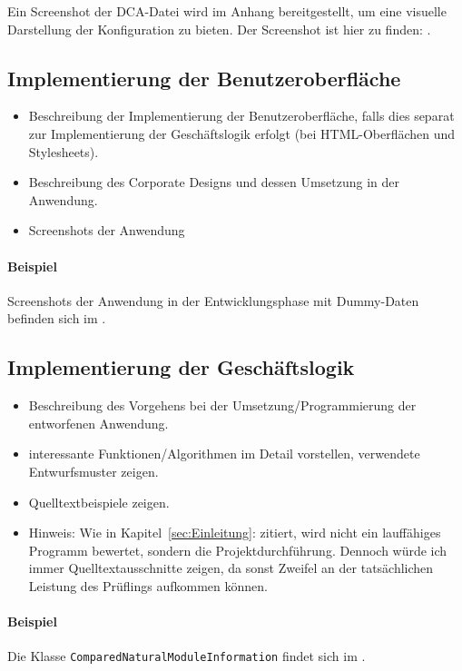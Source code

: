 Ein Screenshot der DCA-Datei wird im Anhang bereitgestellt, um eine visuelle Darstellung der Konfiguration zu bieten. Der Screenshot ist hier zu finden: .

\subsection{Implementierung der Benutzeroberfläche}
\label{sec:ImplementierungBenutzeroberflaeche}

\begin{itemize}
	\item Beschreibung der Implementierung der Benutzeroberfläche, falls dies separat zur Implementierung der Geschäftslogik erfolgt (\zB bei \acs{HTML}-Oberflächen und Stylesheets).
	\item \Ggfs Beschreibung des Corporate Designs und dessen Umsetzung in der Anwendung.
	\item Screenshots der Anwendung
\end{itemize}

\paragraph{Beispiel}
Screenshots der Anwendung in der Entwicklungsphase mit Dummy-Daten befinden sich im .


\subsection{Implementierung der Geschäftslogik}
\label{sec:ImplementierungGeschaeftslogik}

\begin{itemize}
	\item Beschreibung des Vorgehens bei der Umsetzung/Programmierung der entworfenen Anwendung.
	\item \Ggfs interessante Funktionen/Algorithmen im Detail vorstellen, verwendete Entwurfsmuster zeigen.
	\item Quelltextbeispiele zeigen.
	\item Hinweis: Wie in Kapitel~\ref{sec:Einleitung}:  zitiert, wird nicht ein lauffähiges Programm bewertet, sondern die Projektdurchführung. Dennoch würde ich immer Quelltextausschnitte zeigen, da sonst Zweifel an der tatsächlichen Leistung des Prüflings aufkommen können.
\end{itemize}

\paragraph{Beispiel}
Die Klasse \texttt{Com\-par\-ed\-Na\-tu\-ral\-Mo\-dule\-In\-for\-ma\-tion} findet sich im .  
